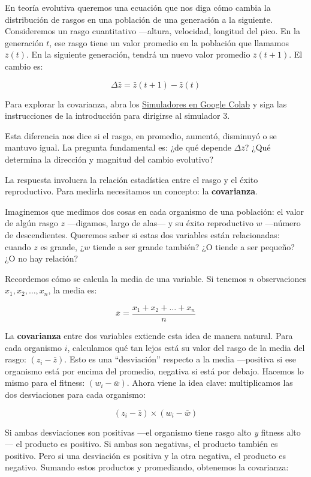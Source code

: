 \documentclass[
  letterpaper,
  DIV=11,
  numbers=noendperiod]{scrreprt}
\begin{document}
En teoría evolutiva queremos una ecuación que nos diga cómo cambia la
distribución de rasgos en una población de una generación a la
siguiente. Consideremos un rasgo cuantitativo ---altura, velocidad,
longitud del pico. En la generación \(t\), ese rasgo tiene un valor
promedio en la población que llamamos \(\bar{z}(t)\). En la siguiente
generación, tendrá un nuevo valor promedio \(\bar{z}(t+1)\). El cambio
es:

\[\Delta \bar{z} = \bar{z}(t+1) - \bar{z}(t)\]

Para explorar la covarianza, abra los
\href{https://colab.research.google.com/drive/1jzI4TI74eFj9ORO63YleCOq99sq0aXO0}{Simuladores
en Google Colab} y siga las instrucciones de la introducción para
dirigirse al simulador 3.

Esta diferencia nos dice si el rasgo, en promedio, aumentó, disminuyó o
se mantuvo igual. La pregunta fundamental es: ¿de qué depende
\(\Delta \bar{z}\)? ¿Qué determina la dirección y magnitud del cambio
evolutivo?

La respuesta involucra la relación estadística entre el rasgo y el éxito
reproductivo. Para medirla necesitamos un concepto: la
\textbf{covarianza}.

Imaginemos que medimos dos cosas en cada organismo de una población: el
valor de algún rasgo \(z\) ---digamos, largo de alas--- y su éxito
reproductivo \(w\) ---número de descendientes. Queremos saber si estas
dos variables están relacionadas: cuando \(z\) es grande, ¿\(w\) tiende
a ser grande también? ¿O tiende a ser pequeño? ¿O no hay relación?

Recordemos cómo se calcula la media de una variable. Si tenemos \(n\)
observaciones \(x_1, x_2, \ldots, x_n\), la media es:

\[\bar{x} = \frac{x_1 + x_2 + \dots + x_n}{n}\]

La \textbf{covarianza} entre dos variables extiende esta idea de manera
natural. Para cada organismo \(i\), calculamos qué tan lejos está su
valor del rasgo de la media del rasgo: \((z_i - \bar{z})\). Esto es una
``desviación'' respecto a la media ---positiva si ese organismo está por
encima del promedio, negativa si está por debajo. Hacemos lo mismo para
el fitness: \((w_i - \bar{w})\). Ahora viene la idea clave:
multiplicamos las dos desviaciones para cada organismo:

\[(z_i - \bar{z}) \times (w_i - \bar{w})\]

Si ambas desviaciones son positivas ---el organismo tiene rasgo alto
\emph{y} fitness alto--- el producto es positivo. Si ambas son
negativas, el producto también es positivo. Pero si una desviación es
positiva y la otra negativa, el producto es negativo. Sumando estos
productos y promediando, obtenemos la covarianza:
\end{document}
